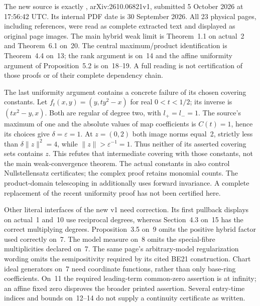 The new source is exactly \cite{Irokawa26RegularV1},
arXiv:\allowbreak 2610.06821v1, submitted 5 October 2026 at
17:56:42 UTC. Its internal PDF date is 30 September 2026.
All 23 physical pages, including references, were read as complete
extracted text and displayed as original page images. The main hybrid
weak limit is Theorem~1.1 on actual~2 and Theorem~6.1 on~20.
The central maximum/product identification is Theorem~4.4 on~13;
the rank argument is on~14 and the affine uniformity argument of
Proposition~5.2 is on~18--19. A full reading is not certification
of those proofs or of their complete dependency chain.

The last uniformity argument contains a concrete failure of its
chosen covering constants. Let
$f_t(x,y)=(y,ty^2-x)$ for real $0<t<1/2$; its inverse is
$(tx^2-y,x)$. Both are regular of degree two, with $l_+=l_-=1$.
The source's maximum of one and the absolute values of map coefficients
is $C(t)=1$, hence its choices give $\delta=\varepsilon=1$.
At $z=(0,2)$ both image norms equal~2, strictly less than
$\delta\|z\|^2=4$, while $\|z\|>\varepsilon^{-1}=1$.
Thus neither of its asserted covering sets contains $z$.
This refutes that intermediate covering with those constants, not
the main weak-convergence theorem. The actual constants in
\cite{Kawaguchi13RegularPublished} also control Nullstellensatz
certificates; the complex proof retains monomial counts. The
product-domain telescoping in \cite{Lee12RegularPairV2} additionally
uses forward invariance. A complete replacement of the recent
uniformity proof has not been certified here.

Other literal interfaces of the new v1 need correction. Its first
pullback displays on actual~1 and~10 use reciprocal degrees, whereas
Section~4.3 on~15 has the correct multiplying degrees.
Proposition~3.5 on~9 omits the positive hybrid factor used correctly
on~7. The model measure on~8 omits the special-fibre multiplicities
declared on~7. The same page's arbitrary-model regularization wording
omits the semipositivity required by its cited BE21 construction.
Chart ideal generators on~7 need coordinate functions, rather than
only base-ring coefficients. On~11 the required leading-term common-zero
assertion is at infinity; an affine fixed zero disproves the broader
printed assertion. Several entry-time indices and bounds on~12--14
do not supply a continuity certificate as written.

